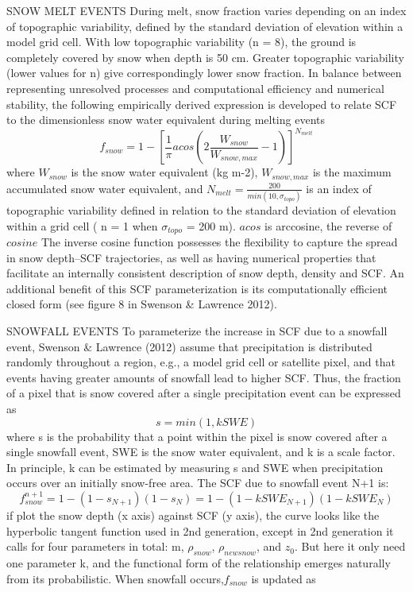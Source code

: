\documentclass{article}
\begin{document}
SNOW MELT EVENTS
During melt, snow fraction varies depending on an index of topographic variability, defined by the standard deviation of elevation within a model grid cell. With low topographic variability (n = 8), the ground is completely covered by snow when depth is 50 cm. Greater topographic variability (lower values for n) give correspondingly lower snow fraction.
In balance between representing unresolved processes and computational efficiency and numerical stability, the following empirically derived expression is developed to relate SCF to the dimensionless snow water equivalent during melting events
\begin{equation}
f_{snow}=1 - [ \frac{1}{\pi} acos (2\frac{W_{snow}}{W_{snow,max}}  - 1) ]^{N_{melt}} 
\end{equation}
where $W_{snow}$ is the snow water equivalent (kg m-2), $W_{snow,max}$ is the maximum accumulated snow water equivalent, and $N_{melt} = \frac{200}{min(10,\sigma_{topo})}$ is an index of topographic variability defined in relation to the standard deviation of elevation within a grid cell ( n = 1 when $\sigma_{topo}$ = 200 m). $acos$ is arccosine, the reverse of $cosine$ 
The inverse cosine function possesses the flexibility to capture the spread in snow depth–SCF trajectories, as well as having numerical properties that facilitate an internally consistent description of snow depth, density and SCF. An additional benefit of this SCF parameterization is its computationally efficient closed form (see figure 8 in Swenson & Lawrence 2012).

SNOWFALL EVENTS
To parameterize the increase in SCF due to a snowfall event, Swenson & Lawrence (2012) assume that precipitation is distributed randomly throughout a region, e.g., a model grid cell or satellite pixel, and that events having greater amounts of snowfall lead to higher SCF. Thus, the fraction of a pixel that is snow covered after a single precipitation event can be expressed as
\begin{equation}
s = min(1,kSWE)
\end{equation}where s is the probability that a point within the pixel is snow covered after a single snowfall event, SWE is the snow water equivalent, and k is a scale factor. In principle, k can be estimated by measuring s and SWE when precipitation occurs over an initially snow-free area. The SCF due to snowfall event N+1 is:
\begin{equation}
f_{snow}^{n+1} = 1-(1-s_{N+1})(1-s_{N}) = 1-(1-kSWE_{N+1})(1-kSWE_{N})
\end{equation}if plot the snow depth (x axis) against SCF (y axis), the curve looks like the hyperbolic tangent function used in 2nd generation, except in 2nd generation it calls for four parameters in total: m, $\rho_{snow}$, $\rho_{newsnow}$, and $z_0$. But here it only need one parameter k, and the functional form of the relationship emerges naturally from its probabilistic. 
When snowfall occurs,$f_{snow}$ is updated as
\end{document}
